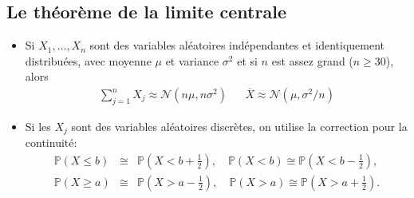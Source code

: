 \documentclass[12pt,french]{article}
\begin{document}
%
%
%




\subsection*{Le théorème de la limite centrale}

\vspace{0.1in}
\begin{itemize}
\item
Si $X_1,\hdots, X_n$ sont des variables aléatoires
indépendantes et identiquement distribuées, avec moyenne $\mu$
et variance $\sigma^2$ et si $n$ est assez grand
($n\ge  30$), alors
\vspace{-0.2cm}
\begin{align*}
    \sum\limits_{j=1}^n X_j\approx \mathcal{N}(n\mu, n\sigma^2) & & \overline{X}\approx \mathcal{N}(\mu,\sigma^2/n)
\end{align*}

\item
Si les $X_j$ sont des variables aléatoires
discrètes, on utilise la correction pour la continuité:
\begin{eqnarray*}
\mathbb{P}(X \leq b) &\cong& \mathbb{P}\left(X < b+\frac12\right), \quad {\mathbb
P}(X < b) \cong \mathbb{P}\left(X < b - \frac12\right), \\ \mathbb{P}(X \geq a) &\cong& \mathbb{P}\left(X
> a-\frac12\right), \quad \mathbb{P}(X > a) \cong \mathbb{P}\left(X > a+\frac12\right).
\end{eqnarray*}
\end{itemize}
\end{document}
